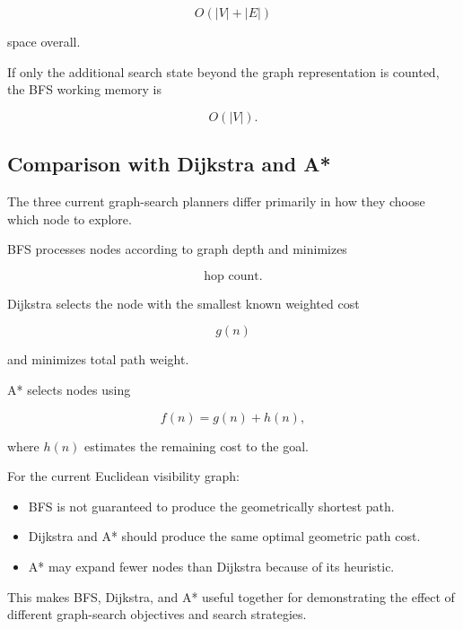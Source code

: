 \[
O(|V|+|E|)
\]

space overall.

If only the additional search state beyond the graph representation is
counted, the BFS working memory is

\[
O(|V|).
\]

\subsection{Comparison with Dijkstra and A*}

The three current graph-search planners differ primarily in how they choose
which node to explore.

BFS processes nodes according to graph depth and minimizes

\[
\text{hop count}.
\]

Dijkstra selects the node with the smallest known weighted cost

\[
g(n)
\]

and minimizes total path weight.

A* selects nodes using

\[
f(n)=g(n)+h(n),
\]

where $h(n)$ estimates the remaining cost to the goal.

For the current Euclidean visibility graph:

\begin{itemize}
    \item BFS is not guaranteed to produce the geometrically shortest path.
    \item Dijkstra and A* should produce the same optimal geometric path cost.
    \item A* may expand fewer nodes than Dijkstra because of its heuristic.
\end{itemize}

This makes BFS, Dijkstra, and A* useful together for demonstrating the effect
of different graph-search objectives and search strategies.